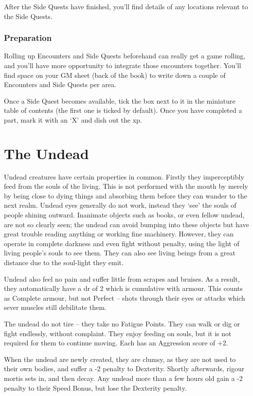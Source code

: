 \begin{multicols}{2}
After the Side Quests have finished, you'll find details of any locations relevant to the Side Quests.

\subsubsection{Preparation}

Rolling up Encounters and Side Quests beforehand can really get a game rolling, and you'll have more opportunity to integrate those encounters together.
You'll find space on your GM sheet (back of the book) to write down a couple of Encounters and Side Quests per area.

Once a Side Quest becomes available, tick the box next to it in the miniature table of contents (the first one is ticked by default).
Once you have completed a part, mark it with an `X' and dish out the \gls{xp}.

\end{multicols}

\section{The Undead}

\begin{multicols}{2}

\noindent
Undead creatures have certain properties in common. Firstly they imperceptibly feed from the souls of the living. This is not performed with the mouth by merely by being close to dying things and absorbing them before they can wander to the next realm. Undead eyes generally do not work, instead they `see' the souls of people shining outward. Inanimate objects such as books, or even fellow undead, are not so clearly seen; the undead can avoid bumping into these objects but have great trouble reading anything or working fine machinery. However, they can operate in complete darkness and even fight without penalty, using the light of living people's souls to see them. They can also see living beings from a great distance due to the soul-light they emit.

Undead also feel no pain and suffer little from scrapes and bruises. As a result, they automatically have a \gls{dr} of 2 which is cumulative with armour. This counts as Complete armour, but not Perfect -- shots through their eyes or attacks which sever muscles still debilitate them.

The undead do not tire -- they take no Fatigue Points. They can walk or dig or fight endlessly, without complaint.
They enjoy feeding on souls, but it is not required for them to continue moving.
Each has an Aggression score of +2.

When the undead are newly created, they are clumsy, as they are not used to their own bodies, and suffer a -2 penalty to Dexterity.
Shortly afterwards, rigour mortis sets in, and then decay.
Any undead more than a few hours old gain a -2 penalty to their Speed Bonus, but lose the Dexterity penalty.

\end{multicols}

